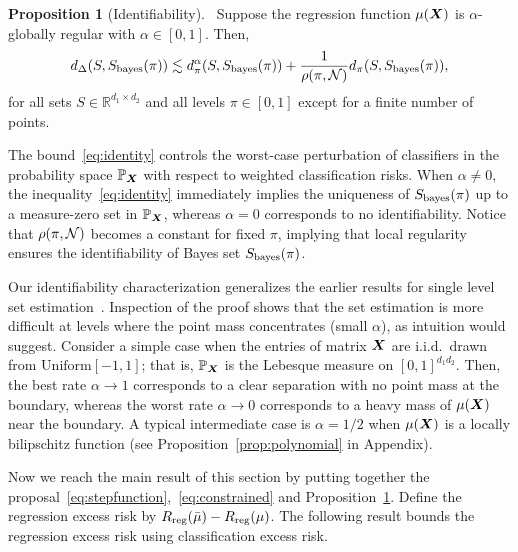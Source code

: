 \documentclass[11pt]{article}
\theoremstyle{plain}
\theoremstyle{definition}
\newtheorem{prop}{Proposition}
\def\bayesS{S_{\textup{bayes}}}
\begin{document}
\begin{prop}[Identifiability]~\label{thm:identifiability} Suppose the regression function $\mu(\bm X)$ is $\alpha$-globally regular with $\alpha\in[0,1]$. Then, 
\begin{align}\label{eq:identity}
d_{\Delta}(S,\bayesS(\pi)) \lesssim d_\pi^\alpha(S,\bayesS(\pi))+{1\over\rho(\pi, \tN)} d_\pi(S,\bayesS(\pi)),
\end{align}
for all sets $S\in\mathbb{R}^{d_1\times d_2}$ and all levels $\pi\in[0,1]$ except for a finite number of points. 
\end{prop}

The bound~\eqref{eq:identity} controls the worst-case perturbation of classifiers in the probability space $\mathbb{P}_{\bm X}$ with respect to weighted classification risks. When $\alpha\neq 0$, the inequality~\eqref{eq:identity} immediately implies the uniqueness of $\bayesS(\pi)$ up to a measure-zero set in $\mathbb{P}_{\bm X}$, whereas $\alpha=0$ corresponds to no identifiability.  Notice that $\rho(\pi,\mathcal{N})$ becomes a constant for fixed $\pi$, implying that local regularity ensures the identifiability of Bayes set $\bayesS(\pi)$.


Our identifiability characterization generalizes the earlier results for single level set estimation~\citep{singh2009adaptive,xu2020class}. Inspection of the proof shows that the set estimation is more difficult at levels where the point mass concentrates (small $\alpha$), as intuition would suggest. Consider a simple case when the entries of matrix $\bm X$ are i.i.d.\ drawn from $\text{Uniform}[-1,1]$; that is, $\mathbb{P}_{\bm X}$ is the Lebesque measure on $[0,1]^{d_1d_2}$. Then, the best rate $\alpha\to 1$ corresponds to a clear separation with no point mass at the boundary, whereas the worst rate $\alpha\to 0$ corresponds to a heavy mass of $\mu(\bm X)$ near the boundary. A typical intermediate case is $\alpha=1/2$ when $\mu(\bm X)$ is a locally bilipschitz function (see Proposition~\ref{prop:polynomial} in Appendix).

Now we reach the main result of this section by putting together the proposal~\eqref{eq:stepfunction},~\eqref{eq:constrained} and Proposition~\ref{thm:identifiability}. Define the regression excess risk by $R_{\textup{reg}}(\bar \mu) - R_{\textup{reg}}(\mu)$.
The following result bounds the regression excess risk using classification excess risk.
\end{document}
